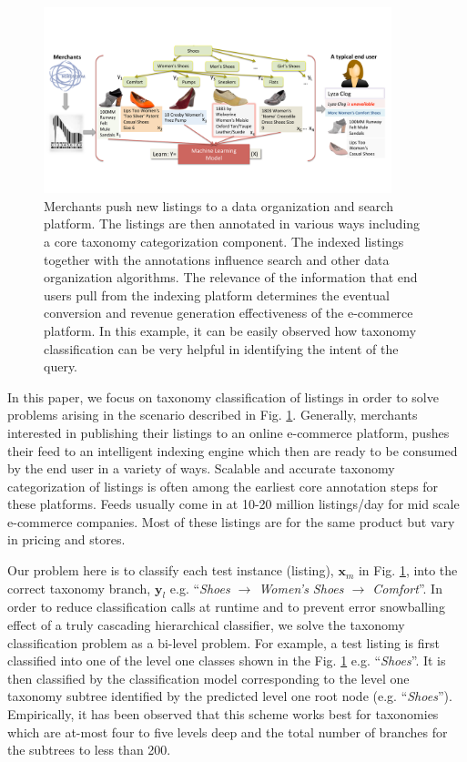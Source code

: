 \begin{figure}[ht]
	\centering
	\includegraphics[width=0.9\textwidth]{images/push-pull}
	\vspace{-0.2cm}
	\caption{{\small Merchants push new listings to a data organization and search platform. The listings are then annotated in various ways including a core taxonomy categorization component. The indexed listings together with the annotations influence search and other data organization algorithms. The relevance of the information that end users pull from the indexing platform determines the eventual conversion and revenue generation effectiveness of the e-commerce platform. In this example, it can be easily observed how taxonomy classification can be very helpful in identifying the intent of the query.}}
	\label{Fig:push-pull}
\end{figure}
\vspace{-0.5cm}

In this paper, we focus on taxonomy classification of listings in order to solve problems arising in the scenario described in Fig. \ref{Fig:push-pull}.
Generally, merchants interested in publishing their listings to an online e-commerce platform, pushes their feed to an intelligent indexing engine which then are ready to be consumed by the end user in a variety of ways.
Scalable and accurate taxonomy categorization of listings is often among the earliest core annotation steps for these platforms.
Feeds usually come in at 10-20 million listings/day for mid scale e-commerce companies.
Most of these listings are for the same product but vary in pricing and stores.

Our problem here is to classify each test instance (listing), $\mathbf{x}_m$ in Fig. \ref{Fig:push-pull}, into the correct taxonomy branch, $\mathbf{y}_l$ e.g. ``\textit{Shoes $\rightarrow$ Women's Shoes $\rightarrow$ Comfort}''.
In order to reduce classification calls at runtime and to prevent error snowballing effect of a truly cascading hierarchical classifier, we solve the taxonomy classification problem as a bi-level problem.
For example, a test listing is first classified into one of the level one classes shown in the Fig. \ref{Fig:push-pull} e.g. ``\textit{Shoes}''.
It is then classified by the classification model corresponding to the level one taxonomy subtree identified by the predicted level one root node (e.g. ``\textit{Shoes}'').
Empirically, it has been observed that this scheme works best for taxonomies which are at-most four to five levels deep and the total number of branches for the subtrees to less than 200. 


